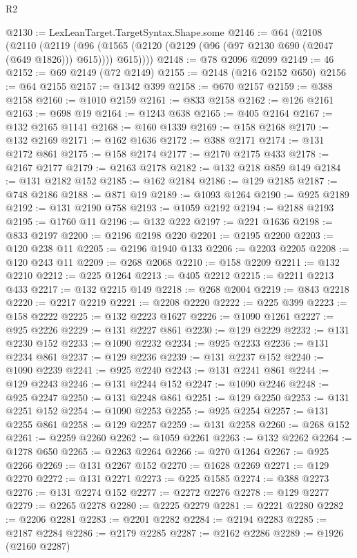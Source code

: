 \begin{lexlean}{R2}
\begin{coremodule}
@2130 := LexLeanTarget.TargetSyntax.Shape.some
@2146 := @64
    (@2108
      (@2110
        (@2119
          (@96 (@1565 (@2120 (@2129 (@96 (@97 @2130 @690 (@2047 (@649 @1826))) @615)))) @615))))
@2148 := @78 @2096 @2099
@2149 := 46
@2152 := @69 @2149 (@72 @2149)
@2155 := @2148 (@216 @2152 @650)
@2156 := @64 @2155
@2157 := @1342 @399
@2158 := @670 @2157
@2159 := @388 @2158
@2160 := @1010 @2159
@2161 := @833 @2158
@2162 := @126 @2161
@2163 := @698 @19
@2164 := @1243 @638
@2165 := @405 @2164
@2167 := @132 @2165 @1141
@2168 := @160 @1339
@2169 := @158 @2168
@2170 := @132 @2169
@2171 := @162 @1636
@2172 := @388 @2171
@2174 := @131 @2172 @861
@2175 := @158 @2174
@2177 := @2170 @2175 @433
@2178 := @2167 @2177
@2179 := @2163 @2178
@2182 := @132 @218 @859 @149
@2184 := @131 @2182 @152
@2185 := @162 @2184
@2186 := @129 @2185
@2187 := @748 @2186
@2188 := @871 @19
@2189 := @1093 @1264
@2190 := @925 @2189
@2192 := @131 @2190 @758
@2193 := @1059 @2192
@2194 := @2188 @2193
@2195 := @1760 @11
@2196 := @132 @222
@2197 := @221 @1636
@2198 := @833 @2197
@2200 := @2196 @2198 @220
@2201 := @2195 @2200
@2203 := @120 @238 @11
@2205 := @2196 @1940 @133
@2206 := @2203 @2205
@2208 := @120 @243 @11
@2209 := @268 @2068
@2210 := @158 @2209
@2211 := @132 @2210
@2212 := @225 @1264
@2213 := @405 @2212
@2215 := @2211 @2213 @433
@2217 := @132 @2215 @149
@2218 := @268 @2004
@2219 := @843 @2218
@2220 := @2217 @2219
@2221 := @2208 @2220
@2222 := @225 @399
@2223 := @158 @2222
@2225 := @132 @2223 @1627
@2226 := @1090 @1261
@2227 := @925 @2226
@2229 := @131 @2227 @861
@2230 := @129 @2229
@2232 := @131 @2230 @152
@2233 := @1090 @2232
@2234 := @925 @2233
@2236 := @131 @2234 @861
@2237 := @129 @2236
@2239 := @131 @2237 @152
@2240 := @1090 @2239
@2241 := @925 @2240
@2243 := @131 @2241 @861
@2244 := @129 @2243
@2246 := @131 @2244 @152
@2247 := @1090 @2246
@2248 := @925 @2247
@2250 := @131 @2248 @861
@2251 := @129 @2250
@2253 := @131 @2251 @152
@2254 := @1090 @2253
@2255 := @925 @2254
@2257 := @131 @2255 @861
@2258 := @129 @2257
@2259 := @131 @2258
@2260 := @268 @152
@2261 := @2259 @2260
@2262 := @1059 @2261
@2263 := @132 @2262
@2264 := @1278 @650
@2265 := @2263 @2264
@2266 := @270 @1264
@2267 := @925 @2266
@2269 := @131 @2267 @152
@2270 := @1628 @2269
@2271 := @129 @2270
@2272 := @131 @2271
@2273 := @225 @1585
@2274 := @388 @2273
@2276 := @131 @2274 @152
@2277 := @2272 @2276
@2278 := @129 @2277
@2279 := @2265 @2278
@2280 := @2225 @2279
@2281 := @2221 @2280
@2282 := @2206 @2281
@2283 := @2201 @2282
@2284 := @2194 @2283
@2285 := @2187 @2284
@2286 := @2179 @2285
@2287 := @2162 @2286
@2289 := @1926 (@2160 @2287)

\end{coremodule}
\end{lexlean}
